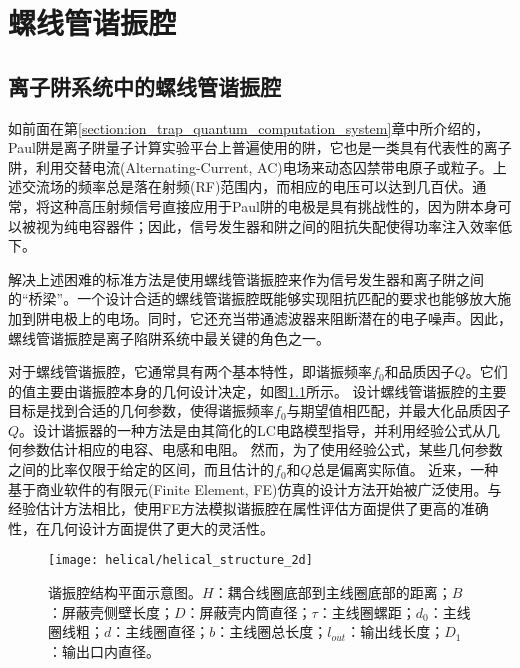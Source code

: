 
\chapter[螺线管谐振腔]{螺线管谐振腔\label{section:helical}}
\section[离子阱系统中的螺线管谐振腔]{离子阱系统中的螺线管谐振腔}

如前面在第\ref{section:ion_trap_quantum_computation_system}章中所介绍的，Paul阱是离子阱量子计算实验平台上普遍使用的阱，它也是一类具有代表性的离子阱，利用交替电流(Alternating-Current, AC)电场来动态囚禁带电原子或粒子。上述交流场的频率总是落在射频(RF)范围内，而相应的电压可以达到几百伏。通常，将这种高压射频信号直接应用于Paul阱的电极是具有挑战性的，因为阱本身可以被视为纯电容器件；因此，信号发生器和阱之间的阻抗失配使得功率注入效率低下。

解决上述困难的标准方法是使用螺线管谐振腔来作为信号发生器和离子阱之间的“桥梁”。一个设计合适的螺线管谐振腔既能够实现阻抗匹配的要求也能够放大施加到阱电极上的电场。同时，它还充当带通滤波器来阻断潜在的电子噪声。因此，螺线管谐振腔是离子陷阱系统中最关键的角色之一。

对于螺线管谐振腔，它通常具有两个基本特性，即谐振频率$f_0$和品质因子$Q$。它们的值主要由谐振腔本身的几何设计决定，如图\ref{fig:helical_structure_2d}所示。
设计螺线管谐振腔的主要目标是找到合适的几何参数，使得谐振频率$f_0$与期望值相匹配，并最大化品质因子$Q$。设计谐振器的一种方法是由其简化的LC电路模型指导，并利用经验公式从几何参数估计相应的电容、电感和电阻。
然而，为了使用经验公式，某些几何参数之间的比率仅限于给定的区间，而且估计的$f_0$和$Q$总是偏离实际值。
近来，一种基于商业软件的有限元(Finite Element, FE)仿真的设计方法开始被广泛使用。与经验估计方法相比，使用FE方法模拟谐振腔在属性评估方面提供了更高的准确性，在几何设计方面提供了更大的灵活性。

\begin{figure}
    \centering
    \caption[谐振腔结构平面示意图]{谐振腔结构平面示意图。$H$：耦合线圈底部到主线圈底部的距离；$B$：屏蔽壳侧壁长度；$D$：屏蔽壳内筒直径；$\tau$：主线圈螺距；$d_0$：主线圈线粗；$d$：主线圈直径；$b$：主线圈总长度；$l_{out}$：输出线长度；$D_1$：输出口内直径。\label{fig:helical_structure_2d}}
    \texttt{[image: helical/helical\_structure\_2d]}
\end{figure}

